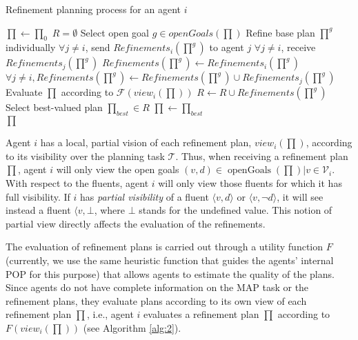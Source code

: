 \documentclass[12pt]{article}
\DeclareMathOperator{\openGoals}{openGoals}
\begin{document}
\begin{algorithm}
\caption{Refinement planning process for an agent $i$}
\label{alg:2}
  \begin{algorithmic}
    \State $\prod \leftarrow \prod_0$
    \State $R = \emptyset$
    \Repeat
      \State Select open goal $g \in openGoals(\prod)$
      \State Refine base plan $\prod^g$ individually
      \State $\forall j \neq i$, send $Refinements_i(\prod^g)$ to agent $j$
      \State $\forall j \neq i$, receive $Refinements_j(\prod^g)$
      \State $Refinements(\prod^g) \leftarrow Refinements_i(\prod^g)$
      \State $\forall j \neq i, Refinements(\prod^g) \leftarrow Refinements(\prod^g) \cup Refinements_j(\prod^g)$
        \State Evaluate $\prod$ according to $\mathcal{F}(view_i(\prod))$
      \EndFor
      \State $R \leftarrow R \cup Refinements(\prod^g)$
      \State Select best-valued plan $\prod_{best} \in R$
      \State $\prod \leftarrow \prod_{best}$
      \If{$\openGoals(\prod) = \emptyset$}\\
        \hspace{\algorithmicindent}\hspace{\algorithmicindent}\Return $\prod$
      \EndIf
  \end{algorithmic}
\end{algorithm}

Agent $i$ has a local, partial vision of each refinement plan, $view_i(\prod)$, according to its visibility over the planning task $\mathcal{T}$. Thus, when receiving a refinement plan $\prod$, agent $i$ will only view the open goals $(v, d) \in \openGoals(\prod) | v \in \mathcal{V}_i$. With respect to the fluents, agent $i$ will only view those fluents for which it has full visibility. If $i$ has \textit{partial visibility} of a fluent $\langle v,d\rangle$ or $\langle v,\neg d\rangle$, it will see instead a fluent $\langle v,\bot$, where $\bot$ stands for the undefined value. This notion of partial view directly affects the evaluation of the refinements.

The evaluation of refinement plans is carried out through a utility function $F$ (currently, we use the same heuristic function that guides the agents' internal POP for this purpose) that allows agents to estimate the quality of the plans. Since agents do not have complete information on the MAP task or the refinement plans, they evaluate plans according to its own view of each refinement plan $\prod$, i.e., agent $i$ evaluates a refinement plan $\prod$ according to $F(view_i(\prod))$ (see Algorithm \ref{alg:2}).
\end{document}
